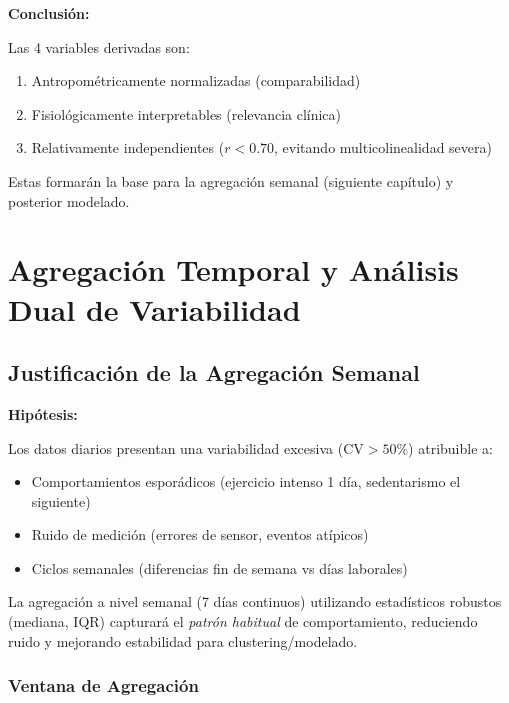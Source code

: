 \documentclass[12pt,letterpaper,twoside]{report}
\begin{document}
\begin{conclusionbox}
\textbf{Conclusión:}

Las 4 variables derivadas son:
\begin{enumerate}[noitemsep]
    \item Antropométricamente normalizadas (comparabilidad)
    \item Fisiológicamente interpretables (relevancia clínica)
    \item Relativamente independientes ($r < 0.70$, evitando multicolinealidad severa)
\end{enumerate}

Estas formarán la base para la agregación semanal (siguiente capítulo) y posterior modelado.
\end{conclusionbox}

\chapter{Agregación Temporal y Análisis Dual de Variabilidad}

\section{Justificación de la Agregación Semanal}

\begin{hipotesisbox}
\textbf{Hipótesis:}

Los datos diarios presentan una variabilidad excesiva ($\text{CV} > 50\%$) atribuible a:
\begin{itemize}[noitemsep]
    \item Comportamientos esporádicos (ejercicio intenso 1 día, sedentarismo el siguiente)
    \item Ruido de medición (errores de sensor, eventos atípicos)
    \item Ciclos semanales (diferencias fin de semana vs días laborales)
\end{itemize}

La agregación a nivel semanal (7 días continuos) utilizando estadísticos robustos (mediana, IQR) capturará el \textit{patrón habitual} de comportamiento, reduciendo ruido y mejorando estabilidad para clustering/modelado.
\end{hipotesisbox}

\subsection{Ventana de Agregación}
\end{document}
